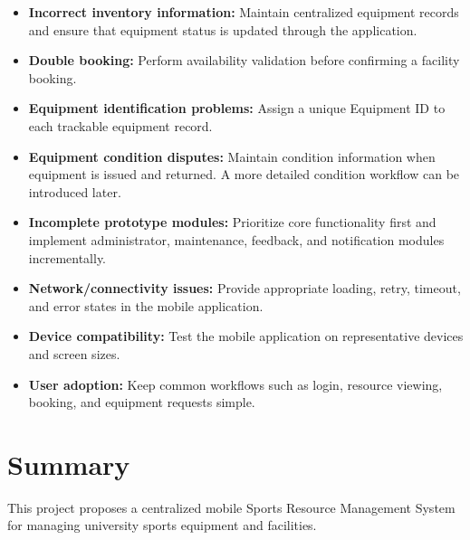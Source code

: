 \documentclass[11pt,a4paper]{article}
\begin{document}
\begin{itemize}[leftmargin=0.7cm]

    \item \textbf{Incorrect inventory information:}
    Maintain centralized equipment records and ensure that equipment
    status is updated through the application.

    \item \textbf{Double booking:}
    Perform availability validation before confirming a facility
    booking.

    \item \textbf{Equipment identification problems:}
    Assign a unique Equipment ID to each trackable equipment record.

    \item \textbf{Equipment condition disputes:}
    Maintain condition information when equipment is issued and
    returned. A more detailed condition workflow can be introduced
    later.

    \item \textbf{Incomplete prototype modules:}
    Prioritize core functionality first and implement administrator,
    maintenance, feedback, and notification modules incrementally.

    \item \textbf{Network/connectivity issues:}
    Provide appropriate loading, retry, timeout, and error states in
    the mobile application.

    \item \textbf{Device compatibility:}
    Test the mobile application on representative devices and screen
    sizes.

    \item \textbf{User adoption:}
    Keep common workflows such as login, resource viewing, booking, and
    equipment requests simple.

\end{itemize}


\section{Summary}

This project proposes a centralized mobile Sports Resource Management
System for managing university sports equipment and facilities.
\end{document}
